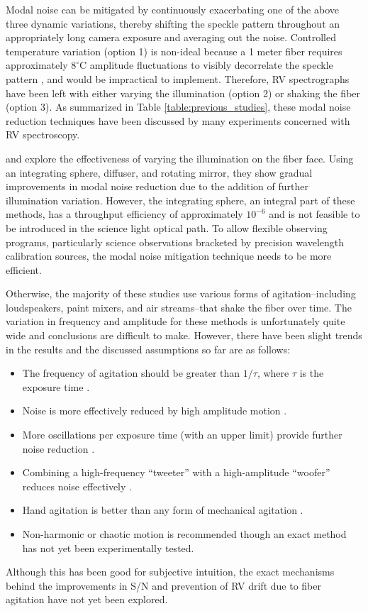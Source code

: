 \documentclass[twocolumn]{emulateapj}
\begin{document}
Modal noise can be mitigated by continuously exacerbating one of the above three dynamic variations, thereby shifting the speckle pattern throughout an appropriately long camera exposure and averaging out the noise. Controlled temperature variation (option 1) is non-ideal because a 1 meter fiber requires approximately $8 ^\circ \mathrm{C}$ amplitude fluctuations to visibly decorrelate the speckle pattern \citep{Redding2013}, and would be impractical to implement. Therefore, RV spectrographs have been left with either varying the illumination (option 2) or shaking the fiber (option 3). As summarized in Table \ref{table:previous_studies}, these modal noise reduction techniques have been discussed by many experiments concerned with RV spectroscopy.

\citet{Mahadevan2014} and \citet{Halverson2014} explore the effectiveness of varying the illumination on the fiber face. Using an integrating sphere, diffuser, and rotating mirror, they show gradual improvements in modal noise reduction due to the addition of further illumination variation. However, the integrating sphere, an integral part of these methods, has a throughput efficiency of approximately $10^{-6}$ and is not feasible to be introduced in the science light optical path. To allow flexible observing programs, particularly science observations bracketed by precision wavelength calibration sources, the modal noise mitigation technique needs to be more efficient.

Otherwise, the majority of these studies use various forms of agitation--including loudspeakers, paint mixers, and air streams--that shake the fiber over time. The variation in frequency and amplitude for these methods is unfortunately quite wide and conclusions are difficult to make. However, there have been slight trends in the results and the discussed assumptions so far are as follows:
\begin{itemize}
\item The frequency of agitation should be greater than $1/\tau$, where $\tau$ is the exposure time \citep{Baudrand2001}.
\item Noise is more effectively reduced by high amplitude motion \citep{Lemke2011, McCoy2012}.
\item More oscillations per exposure time (with an upper limit) provide further noise reduction \citep{Lemke2011}.
\item Combining a high-frequency ``tweeter'' with a high-amplitude ``woofer'' reduces noise effectively \citep{Plavchan2013}.
\item Hand agitation is better than any form of mechanical agitation \citep{Lemke2011, McCoy2012, Mahadevan2014, Roy2014}.
\item Non-harmonic or chaotic motion is recommended \citep{Grupp2003} though an exact method has not yet been experimentally tested.
\end{itemize}
Although this has been good for subjective intuition, the exact mechanisms behind the improvements in S/N and prevention of RV drift due to fiber agitation have not yet been explored.
\end{document}

